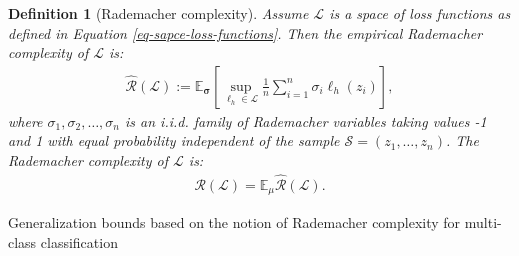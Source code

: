 \documentclass{article}
\newtheorem{definition}{Definition}
\begin{document}
\begin{definition}[Rademacher complexity]
Assume $\mathcal{L}$ is a space of loss functions as defined in Equation \eqref{eq-sapce-loss-functions}.
Then the empirical Rademacher complexity of $\mathcal{L}$ is:
    \begin{align*}
      \hat{\mathcal{R}}(\mathcal{L}):=\mathbb{E}_{\bm \sigma}
      \left[\sup_{\ell_h\in\mathcal{L}}
     \frac{1}{n}\sum_{i=1}^n\sigma_i \ell_{h}(z_i)
          \right],
    \end{align*}
     where $\sigma_1,\sigma_2, \ldots,\sigma_n$
    is an i.i.d. family of Rademacher variables taking values -1 and 1
    with equal probability independent of the sample $\mathcal{S}=(z_1,\ldots,z_n)$.
    The  Rademacher complexity of $\mathcal{L}$ is:
    \begin{align*}
      \mathcal{R}(\mathcal{L})=\mathbb{E}_{\mu}\hat{\mathcal{R}}(\mathcal{L}).
    \end{align*}
\end{definition}
Generalization bounds based on the notion of Rademacher complexity for multi-class classification
\end{document}
